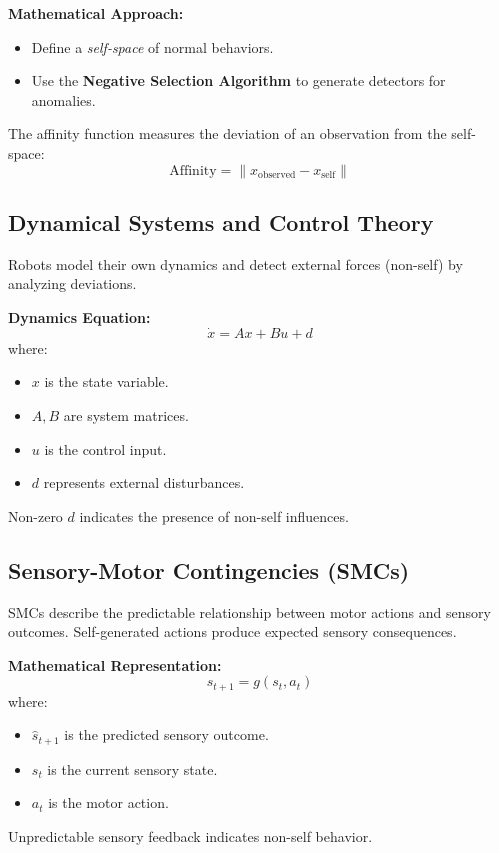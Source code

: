 \textbf{Mathematical Approach:}
\begin{itemize}
    \item Define a \textit{self-space} of normal behaviors.
    \item Use the \textbf{Negative Selection Algorithm} to generate detectors for anomalies.
\end{itemize}

The affinity function measures the deviation of an observation from the self-space:
\begin{equation}
    \text{Affinity} = \| x_{\text{observed}} - x_{\text{self}} \|
\end{equation}

\subsection{Dynamical Systems and Control Theory}
Robots model their own dynamics and detect external forces (non-self) by analyzing deviations.

\textbf{Dynamics Equation:}
\begin{equation}
    \dot{x} = Ax + Bu + d
\end{equation}
where:
\begin{itemize}
    \item \( x \) is the state variable.
    \item \( A, B \) are system matrices.
    \item \( u \) is the control input.
    \item \( d \) represents external disturbances.
\end{itemize}
Non-zero \( d \) indicates the presence of non-self influences.

\subsection{Sensory-Motor Contingencies (SMCs)}
SMCs describe the predictable relationship between motor actions and sensory outcomes. Self-generated actions produce expected sensory consequences.

\textbf{Mathematical Representation:}
\begin{equation}
    \hat{s}_{t+1} = g(s_t, a_t)
\end{equation}
where:
\begin{itemize}
    \item \( \hat{s}_{t+1} \) is the predicted sensory outcome.
    \item \( s_t \) is the current sensory state.
    \item \( a_t \) is the motor action.
\end{itemize}
Unpredictable sensory feedback indicates non-self behavior.

